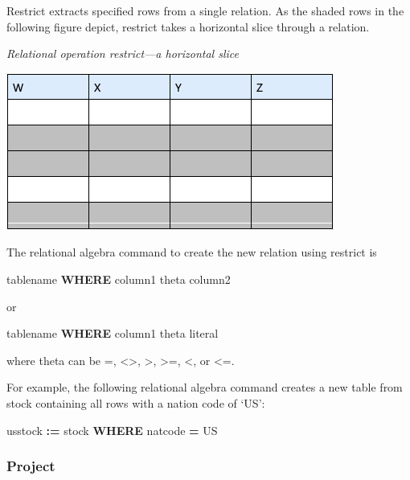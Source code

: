 \documentclass[
]{article}
\newenvironment{Shaded}{\begin{snugshade}}{\end{snugshade}}
\newcommand{\KeywordTok}[1]{\textcolor[rgb]{0.13,0.29,0.53}{\textbf{#1}}}
\newcommand{\NormalTok}[1]{#1}
\newcommand{\OperatorTok}[1]{\textcolor[rgb]{0.81,0.36,0.00}{\textbf{#1}}}
\newcommand{\StringTok}[1]{\textcolor[rgb]{0.31,0.60,0.02}{#1}}
\begin{document}
Restrict extracts specified rows from a single relation. As the shaded
rows in the following figure depict, restrict takes a horizontal slice
through a relation.

\emph{Relational operation restrict---a horizontal slice}

\includegraphics{Figures/Chapter 9/shadowed-rows.png}

The relational algebra command to create the new relation using restrict
is

\begin{Shaded}
\begin{Highlighting}[]
\NormalTok{tablename }\KeywordTok{WHERE}\NormalTok{ column1 theta column2}
\end{Highlighting}
\end{Shaded}

or

\begin{Shaded}
\begin{Highlighting}[]
\NormalTok{tablename }\KeywordTok{WHERE}\NormalTok{ column1 theta literal}
\end{Highlighting}
\end{Shaded}

where theta can be =, \textless\textgreater, \textgreater, \textgreater=, \textless, or \textless=.

For example, the following relational algebra command creates a new
table from stock containing all rows with a nation code of `US':

\begin{Shaded}
\begin{Highlighting}[]
\NormalTok{usstock }\OperatorTok{:=}\NormalTok{ stock }\KeywordTok{WHERE}\NormalTok{ natcode }\OperatorTok{=} \StringTok{\textquotesingle{}US\textquotesingle{}}
\end{Highlighting}
\end{Shaded}

\hypertarget{project}{%
\subsubsection*{Project}\label{project}}
\end{document}
